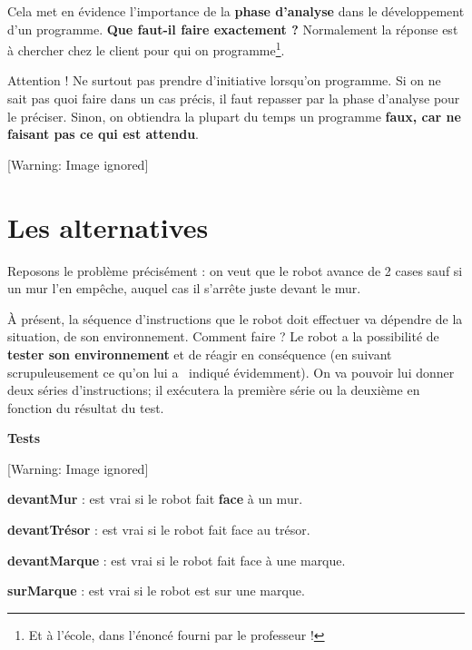 {
Cela met en évidence l'importance de la \textbf{phase
d'analyse} dans le développement d'un
programme. \textbf{Que faut-il faire exactement ?} Normalement la
réponse est à chercher chez le client pour qui on programme\footnote{Et
à l'école, dans l'énoncé fourni par
le professeur ! }.}

{
Attention ! Ne surtout pas prendre d'initiative
lorsqu'on programme. Si on ne sait pas quoi faire dans
un cas précis, il faut repasser par la phase d'analyse
pour le préciser. Sinon, on obtiendra la plupart du temps un programme
\textbf{faux, car ne faisant pas ce qui est attendu}.}

\begin{center}
 [Warning: Image ignored] %

\end{center}
\section{Les alternatives}
{
Reposons le problème précisément : on veut que le robot avance de 2
cases sauf si un mur l'en empêche, auquel cas il
s'arrête juste devant le mur.}

{
À présent, la séquence d'instructions que le robot doit
effectuer va dépendre de la situation, de son environnement. Comment
faire ? Le robot a la possibilité de \textbf{tester son environnement}
et de réagir en conséquence (en suivant scrupuleusement ce
qu'on lui a \ indiqué évidemment). On va pouvoir lui
donner deux séries d'instructions; il exécutera la
première série ou la deuxième en fonction du résultat du test.}

{\bfseries
Tests }

\begin{center}
 [Warning: Image ignored] %

\end{center}
{\sffamily
\textbf{devantMur} : est vrai si le robot fait \textbf{face} à un mur.}

{\sffamily
\textbf{devantTrésor} : est vrai si le robot fait face au trésor.}

{\sffamily
\textbf{devantMarque} : est vrai si le robot fait face à une marque.}

{\sffamily
\textbf{surMarque} : est vrai si le robot est sur une marque.}

